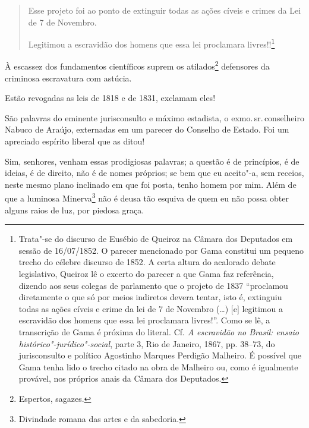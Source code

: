 \begin{quote}
Esse projeto foi ao ponto de extinguir todas as ações cíveis e crimes
da Lei de 7 de Novembro.

Legitimou a escravidão dos homens que essa lei proclamara
livres!!\footnote{Trata"-se do discurso de Eusébio de Queiroz na
  Câmara dos Deputados em sessão de 16/07/1852. O parecer mencionado por
  Gama constitui um pequeno trecho do célebre discurso de 1852. A certa
  altura do acalorado debate legislativo, Queiroz lê o excerto do
  parecer a que Gama faz referência, dizendo aos seus colegas de
  parlamento que o projeto de 1837 ``proclamou diretamente o que só por
  meios indiretos devera tentar, isto é, extinguiu todas as ações cíveis
  e crime da lei de 7 de Novembro (\ldots{}) {[}e{]} legitimou a escravidão
  dos homens que essa lei proclamara livres!''. Como se lê, a transcrição
  de Gama é próxima do literal. Cf. \emph{A escravidão no Brasil: ensaio
  histórico"-jurídico"-social}, parte 3, Rio de Janeiro, 1867, pp. 38--73,
  do jurisconsulto e político Agostinho Marques Perdigão Malheiro. É
 possível que Gama tenha lido o trecho citado na obra de
  Malheiro ou, como é igualmente provável, nos próprios anais da Câmara
  dos Deputados.}
\end{quote}

À escassez dos fundamentos científicos suprem os atilados\footnote{
  Espertos, sagazes.} defensores da criminosa escravatura com astúcia.

Estão revogadas as leis de 1818 e de 1831, exclamam eles!

São palavras do eminente jurisconsulto e máximo estadista, o exmo.\,sr.\,conselheiro Nabuco de Araújo, externadas em um parecer do Conselho de
Estado. Foi um apreciado espírito liberal que as ditou!

Sim, senhores, venham essas prodigiosas palavras; a questão é de
princípios, é de ideias, é de direito, não é de nomes próprios; se bem
que eu aceito"-a, sem receios, neste mesmo plano inclinado em que foi
posta, tenho homem por mim. Além de que a luminosa Minerva\footnote{
  Divindade romana das artes e da sabedoria.} não é deusa tão esquiva de
quem eu não possa obter alguns raios de luz, por piedosa graça.

